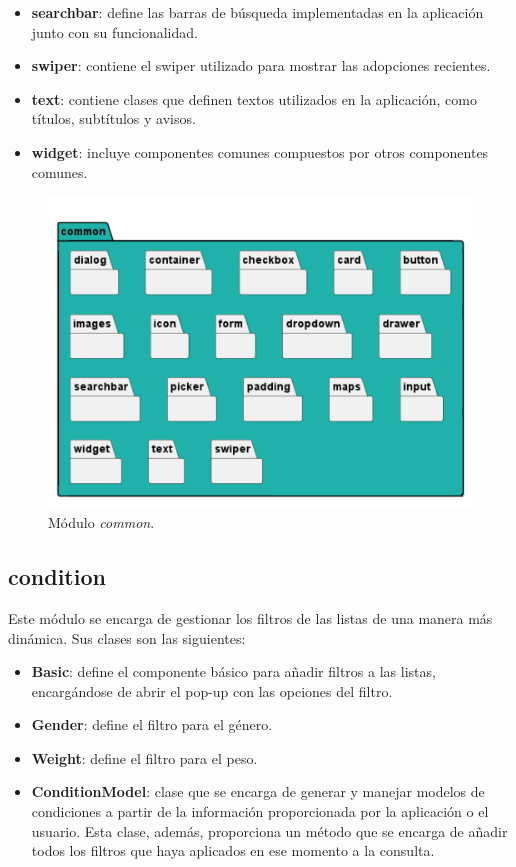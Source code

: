 \documentclass[a4paper, 12pt]{article}
\begin{document}
\begin{itemize}[noitemsep]
	\item \textbf{searchbar}: define las barras de búsqueda implementadas en la aplicación junto con su funcionalidad.
	\item \textbf{swiper}: contiene el swiper utilizado para mostrar las adopciones recientes.
	\item \textbf{text}: contiene clases que definen textos utilizados en la aplicación, como títulos, subtítulos y avisos.
	\item \textbf{widget}: incluye componentes comunes compuestos por otros componentes comunes.
\end{itemize}


\begin{figure}[H]
	\begin{center}
		{\includegraphics[width=0.8\linewidth]{diagram/Common.png}\par}
		\caption{Módulo  \textit{common}.}
	\end{center}
\end{figure}

\subsection*{condition}

Este módulo se encarga de gestionar los filtros de las listas de una manera más dinámica. Sus clases son las siguientes:

\begin{itemize}[noitemsep]
	\item \textbf{Basic}: define el componente básico para añadir filtros a las listas, encargándose de abrir el pop-up con las opciones del filtro.
	\item \textbf{Gender}: define el filtro para el género.
	\item \textbf{Weight}: define el filtro para el peso.
	\item \textbf{ConditionModel}: clase que se encarga de generar y manejar modelos de condiciones a partir de la información proporcionada por la aplicación o el usuario. Esta clase, además, proporciona un método que se encarga de añadir todos los filtros que haya aplicados en ese momento a la consulta.
\end{itemize}
\end{document}
